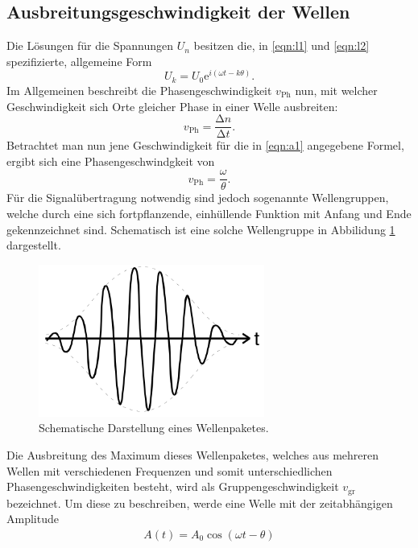 \subsection{Ausbreitungsgeschwindigkeit der Wellen}
Die Lösungen für die Spannungen $U_n$ besitzen die, in \eqref{eqn:l1} und \eqref{eqn:l2} spezifizierte, allgemeine Form
\begin{equation}
  \label{eqn:a1}
  U_k = U_0 \mathrm{e}^{i(\omega t - k \theta)}.
\end{equation}
Im Allgemeinen beschreibt die Phasengeschwindigkeit $v_{\text{Ph}}$ nun, mit welcher Geschwindigkeit sich Orte gleicher Phase in einer Welle ausbreiten:
\begin{equation}
  v_{\text{Ph}} = \frac{\increment{n}}{\increment{t}}.
\end{equation}
Betrachtet man nun jene Geschwindigkeit für die in \eqref{eqn:a1} angegebene Formel, ergibt sich eine Phasengeschwindgkeit von
\begin{equation}
    \label{eqn:phase}
  v_{\text{Ph}} = \frac{\omega}{\theta}.
\end{equation}
Für die Signalübertragung notwendig sind jedoch sogenannte Wellengruppen, welche durch eine sich fortpflanzende, einhüllende Funktion mit Anfang und Ende gekennzeichnet sind.
Schematisch ist eine solche Wellengruppe in Abbilidung \ref{tfig:3} dargestellt.
\begin{figure}[H]
  \centering
  \includegraphics[height=5cm]{wellenpaket.png}
  \caption{Schematische Darstellung eines Wellenpaketes. \cite{sample}}
  \label{tfig:3}
\end{figure}
Die Ausbreitung des Maximum dieses Wellenpaketes, welches aus mehreren Wellen mit verschiedenen Frequenzen und somit unterschiedlichen Phasengeschwindigkeiten besteht, wird als Gruppengeschwindigkeit $v_{\text{gr}}$ bezeichnet.
Um diese zu beschreiben, werde eine Welle mit der zeitabhängigen Amplitude
\begin{align*}
A(t) = A_0 \cos{(\omega t - \theta)}
\end{align*}
